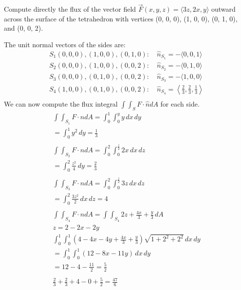 \documentclass[12pt]{exam}
\begin{document}
\begin{questions}
\question Compute directly the flux of the vector field $\overrightarrow{F}(x, y, z) = \langle 3z, 2x, y \rangle$ outward across the surface of the tetrahedron with vertices (0, 0, 0), (1, 0, 0), (0, 1, 0), and (0, 0, 2).
    \begin{solution}
        The unit normal vectors of the sides are:
        \begin{align*}
            S_1 (0, 0, 0), (1, 0, 0), (0, 1, 0):&\ \hat{n}_{S_1} = -\langle 0, 0, 1 \rangle \\
            S_2 (0, 0, 0), (1, 0, 0), (0, 0, 2):&\ \hat{n}_{S_2} = -\langle 0, 1, 0 \rangle \\
            S_3 (0, 0, 0), (0, 1, 0), (0, 0, 2):&\ \hat{n}_{S_3} = -\langle 1, 0, 0 \rangle \\
            S_4 (1, 0, 0), (0, 1, 0), (0, 0, 2):&\ \hat{n}_{S_4} = \left\langle \frac{2}{3}, \frac{2}{3}, \frac{1}{3} \right\rangle \\
        \end{align*}
        We can now compute the flux integral $\int \int_S F \cdot \hat{n} dA$ for each side.
        \begin{gather*}
            \int \int_{S_1} F \cdot \hat{n} dA = \int_{0}^{1}\int_{0}^{y} y \,dx\,dy \\
            =  \int_{0}^{1} y^2 \,dy = \frac{1}{3} \\\\
            \int \int_{S_2} F \cdot \hat{n} dA = \int_{0}^{2}\int_{0}^{\frac{z}{2}} 2x \,dx\,dz \\
            =  \int_{0}^{2} \frac{z^2}{4} \,dy = \frac{2}{3} \\\\
            \int \int_{S_3} F \cdot \hat{n} dA = \int_{0}^{2}\int_{0}^{\frac{z}{2}} 3z \,dx\,dz \\
            = \int_{0}^{2} \frac{3z^2}{2} \,dx\,dz = 4 \\\\
            \int \int_{S_4} F \cdot \hat{n} dA = \int\int_{S_4} 2z + \frac{4x}{3} + \frac{y}{3} \,dA \\
            z = 2 - 2x - 2y\\
            \int_{0}^{1}\int_{0}^{1} \left(4 - 4x - 4y + \frac{4x}{3} + \frac{y}{3}\right)\sqrt{1+2^2+2^2} \,dx\,dy \\
            = \int_{0}^{1}\int_{0}^{1} \left(12 - 8x - 11y\right) \,dx\,dy \\
            = 12 - 4 - \frac{11}{2} = \frac{5}{2} \\\\
            \frac{2}{3} + \frac{2}{3} + 4 - 0 + \frac{5}{2} = \boxed{\frac{47}{6}}
        \end{gather*}
    \end{solution}
    \clearpage


\end{questions}
\end{document}
